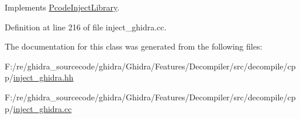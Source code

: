 Implements \mbox{\hyperlink{class_pcode_inject_library_a93f4e4b0f75d81b96bd92623d392269a}{Pcode\+Inject\+Library}}.



Definition at line 216 of file inject\+\_\+ghidra.\+cc.



The documentation for this class was generated from the following files\+:\begin{DoxyCompactItemize}
\item 
F\+:/re/ghidra\+\_\+sourcecode/ghidra/\+Ghidra/\+Features/\+Decompiler/src/decompile/cpp/\mbox{\hyperlink{inject__ghidra_8hh}{inject\+\_\+ghidra.\+hh}}\item 
F\+:/re/ghidra\+\_\+sourcecode/ghidra/\+Ghidra/\+Features/\+Decompiler/src/decompile/cpp/\mbox{\hyperlink{inject__ghidra_8cc}{inject\+\_\+ghidra.\+cc}}\end{DoxyCompactItemize}
